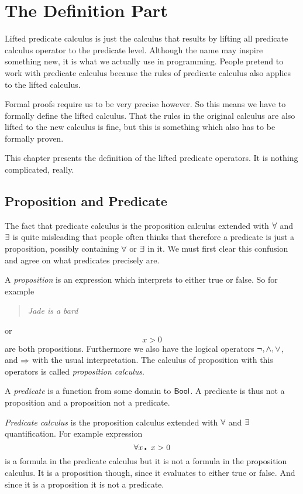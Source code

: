 \enddocs
{}

\chapter{The Definition Part}
\label{def}

Lifted predicate calculus is just the calculus that results by lifting
all predicate calculus operator to the predicate level. Although the
name may inspire something new, it is what we actually use in
programming. People pretend to work with predicate calculus because
the rules of predicate calculus also applies to the lifted calculus.

Formal proofs require us to be very precise however. So this means we
have to formally define the lifted calculus. That the rules in the
original calculus are also lifted to the new calculus is fine, but
this is something which also has to be formally proven. 

This chapter presents the definition of the lifted predicate
operators. It is nothing complicated, really. 

\section{Proposition and Predicate}

The fact that predicate calculus is the proposition calculus extended
with $\forall$ and $\exists$ is quite misleading that people often thinks that
therefore a predicate is just a proposition, possibly containing $\forall$
or $\exists$ in it. We must first clear this confusion and agree on what
predicates precisely are.

A {\em proposition} is an expression which interprets to either true
or false. So for example \begin{quote}
   {\em Jade is a bard}
\end{quote}
or
\[ x>0 \]
are both propositions. Furthermore we also have the logical operators
$\neg, \wedge, \vee$, and $\Rightarrow$ with the usual interpretation. The
calculus of proposition with this operators is called {\em proposition
calculus}.

A {\em predicate} is a function from some domain to ${\sf Bool}$. A
predicate is thus not a proposition and a proposition not a predicate.

{\em Predicate calculus} is the proposition calculus extended with
$\forall$ and $\exists$ quantification. For example expression \[ \qA x\Dot
x>0 \] is a formula in the predicate calculus but it is not a formula
in the proposition calculus.  It is a proposition though, since it
evaluates to either true or false. And since it is a proposition it is
not a predicate.

